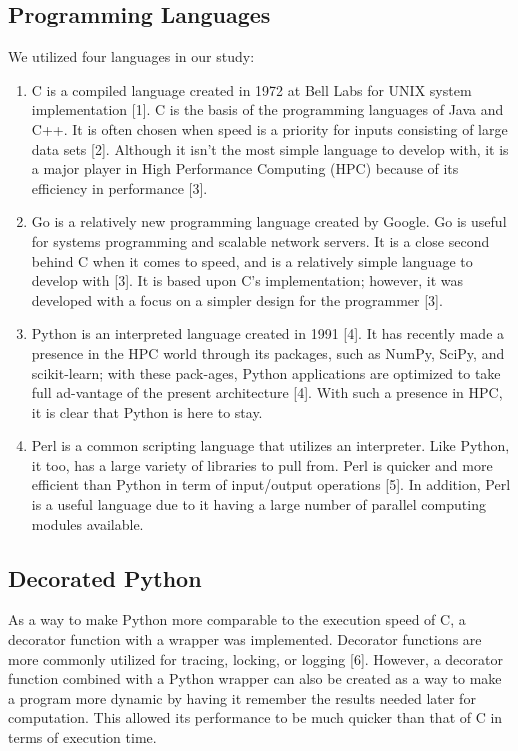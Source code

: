 \documentclass{sig-alternate}
\begin{document}
\subsection{Programming Languages}	

We utilized four languages in our study:

\begin{enumerate}
\item {\em}C is a compiled language created in 1972 at Bell Labs for UNIX system implementation [1]. C is the basis of the programming languages of Java and C++. It is often chosen when speed is a priority for inputs consisting of large data sets [2]. Although it isn't the most simple language to develop with, it is a major player in High Performance Computing (HPC) because of its efficiency in performance [3].
\item {\em}Go is a relatively new programming language created by Google. Go is useful for systems programming and scalable network servers. It is a close second behind C when it comes to speed, and is a relatively simple language to develop with [3]. It is based upon C's implementation; however, it was developed with a focus on a simpler design for the programmer [3]. 
\item {\em}Python is an interpreted language created in 1991 [4]. It has recently made a presence in the HPC world through its packages, such as NumPy, SciPy, and scikit-learn; with these pack-ages, Python applications are optimized to take full 
ad-vantage of the present architecture [4]. With such a presence in HPC, it is clear that Python is here to stay.
\item  {\em}Perl is a common scripting language that utilizes an interpreter. Like Python, it too, has a large variety of libraries to pull from. Perl is quicker and more efficient than Python in term of input/output operations [5]. In addition, Perl is a useful language due to it having a large number of parallel computing modules available.
\end{enumerate}


\subsection{Decorated Python}

As a way to make Python more comparable to the execution speed of C, a decorator function with a wrapper was implemented. Decorator functions are more commonly utilized for tracing, locking, or logging [6]. However, a decorator function combined with a Python wrapper can also be created as a way to make a program more dynamic by having it remember the results needed later for computation. This allowed its performance to be much quicker than that of C in terms of execution time.
\end{document}
